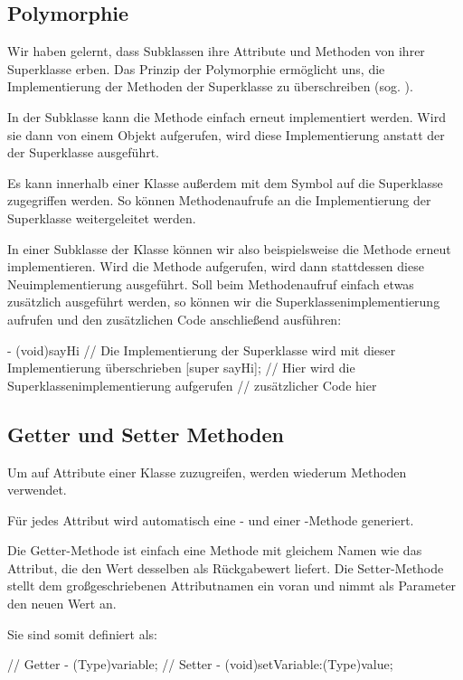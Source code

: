 \documentclass[parskip=half, final]{scrreprt}
\begin{document}
\subsection{Polymorphie}

Wir haben gelernt, dass Subklassen ihre Attribute und Methoden von ihrer Superklasse erben. Das Prinzip der Polymorphie ermöglicht uns, die Implementierung der Methoden der Superklasse zu überschreiben (sog. ).

In der Subklasse kann die Methode einfach erneut implementiert werden. Wird sie dann von einem Objekt aufgerufen, wird diese Implementierung anstatt der der Superklasse ausgeführt.

Es kann innerhalb einer Klasse außerdem mit dem Symbol  auf die Superklasse zugegriffen werden. So können Methodenaufrufe an die Implementierung der Superklasse weitergeleitet werden.

In einer Subklasse der Klasse  können wir also beispielsweise die Methode  erneut implementieren. Wird die Methode aufgerufen, wird dann stattdessen diese Neuimplementierung ausgeführt. Soll beim Methodenaufruf einfach etwas zusätzlich ausgeführt werden, so können wir die Superklassenimplementierung aufrufen und den zusätzlichen Code anschließend ausführen:

\begin{objclst}
- (void)sayHi { // Die Implementierung der Superklasse wird mit dieser Implementierung überschrieben
    [super sayHi]; // Hier wird die Superklassenimplementierung aufgerufen
    // zusätzlicher Code hier
}
\end{objclst}

\subsection{Getter und Setter Methoden}\label{sec:gettersetter}

Um auf Attribute einer Klasse zuzugreifen, werden wiederum Methoden verwendet.

Für jedes Attribut wird automatisch eine - und einer -Methode generiert.

Die Getter-Methode ist einfach eine Methode mit gleichem Namen wie das Attribut, die den Wert desselben als Rückgabewert liefert. Die Setter-Methode stellt dem großgeschriebenen Attributnamen ein  voran und nimmt als Parameter den neuen Wert an.

Sie sind somit definiert als:
\begin{objclst}
// Getter
- (Type)variable;
// Setter
- (void)setVariable:(Type)value;
\end{objclst}
\end{document}
